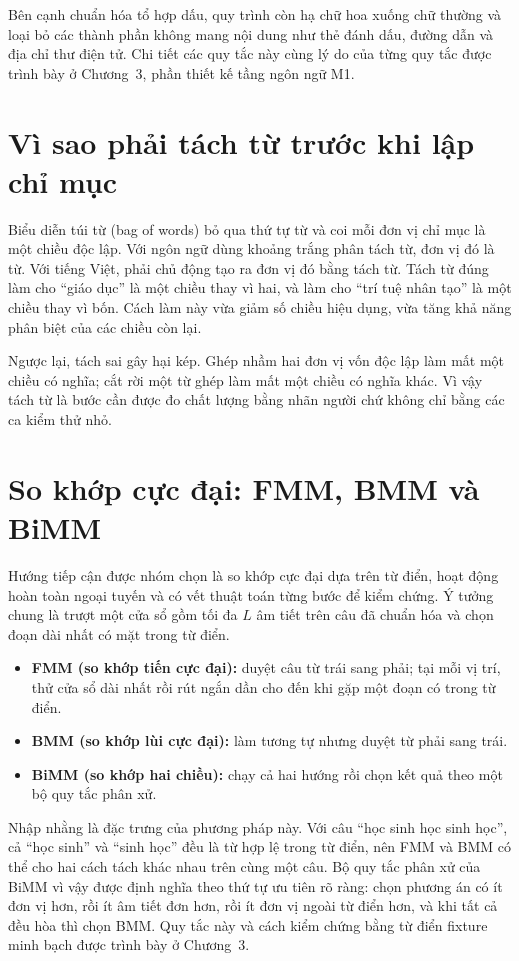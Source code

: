 Bên cạnh chuẩn hóa tổ hợp dấu, quy trình còn hạ chữ hoa xuống chữ thường và loại
bỏ các thành phần không mang nội dung như thẻ đánh dấu, đường dẫn và địa chỉ thư
điện tử. Chi tiết các quy tắc này cùng lý do của từng quy tắc được trình bày ở
Chương~3, phần thiết kế tầng ngôn ngữ M1.

\section{Vì sao phải tách từ trước khi lập chỉ mục}

Biểu diễn túi từ (bag of words) bỏ qua thứ tự từ và coi mỗi đơn vị chỉ mục là một
chiều độc lập. Với ngôn ngữ dùng khoảng trắng phân tách từ, đơn vị đó là từ. Với
tiếng Việt, phải chủ động tạo ra đơn vị đó bằng tách từ. Tách từ đúng làm cho
``giáo dục'' là một chiều thay vì hai, và làm cho ``trí tuệ nhân tạo'' là một chiều
thay vì bốn. Cách làm này vừa giảm số chiều hiệu dụng, vừa tăng khả năng phân biệt
của các chiều còn lại.

Ngược lại, tách sai gây hại kép. Ghép nhầm hai đơn vị vốn độc lập làm mất một
chiều có nghĩa; cắt rời một từ ghép làm mất một chiều có nghĩa khác. Vì vậy tách
từ là bước cần được đo chất lượng bằng nhãn người chứ không chỉ bằng các ca kiểm
thử nhỏ.

\section{So khớp cực đại: FMM, BMM và BiMM}

Hướng tiếp cận được nhóm chọn là so khớp cực đại dựa trên từ điển, hoạt động hoàn
toàn ngoại tuyến và có vết thuật toán từng bước để kiểm chứng. Ý tưởng chung là
trượt một cửa sổ gồm tối đa $L$ âm tiết trên câu đã chuẩn hóa và chọn đoạn dài
nhất có mặt trong từ điển.

\begin{itemize}
  \item \textbf{FMM (so khớp tiến cực đại):} duyệt câu từ trái sang phải; tại mỗi
        vị trí, thử cửa sổ dài nhất rồi rút ngắn dần cho đến khi gặp một đoạn có
        trong từ điển.
  \item \textbf{BMM (so khớp lùi cực đại):} làm tương tự nhưng duyệt từ phải sang
        trái.
  \item \textbf{BiMM (so khớp hai chiều):} chạy cả hai hướng rồi chọn kết quả theo
        một bộ quy tắc phân xử.
\end{itemize}

Nhập nhằng là đặc trưng của phương pháp này. Với câu ``học sinh học sinh học'',
cả ``học sinh'' và ``sinh học'' đều là từ hợp lệ trong từ điển, nên FMM và BMM có
thể cho hai cách tách khác nhau trên cùng một câu. Bộ quy tắc phân xử của BiMM vì
vậy được định nghĩa theo thứ tự ưu tiên rõ ràng: chọn phương án có ít đơn vị hơn,
rồi ít âm tiết đơn hơn, rồi ít đơn vị ngoài từ điển hơn, và khi tất cả đều hòa thì
chọn BMM. Quy tắc này và cách kiểm chứng bằng từ điển fixture minh bạch được trình
bày ở Chương~3.

